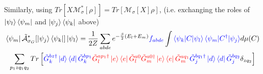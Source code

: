\documentclass[aps,floatfix,10pt,amssymb,amsfont,amsmath,superscriptaddress,float,nofootinbib,longbibliography,nobalancelastpage,twocolumn]{revtex4-2}
\begin{document}
Similarly, using $Tr[X\mathcal{M}^*_{\sigma}[\rho]] = Tr[\mathcal{M}_{\sigma}[X]\rho]$, (i.e. exchanging the roles of $\ket{\psi_l}\bra{\psi_m}$ and $\ket{\psi_j}\bra{\psi_k}$ above)
\begin{multline}
   \bra{\psi_m}\tilde{\mathcal{A}}^*_{\sigma_G}[\ket{\psi_j}\bra{\psi_k}]\ket{\psi_l} =\frac{1}{2Z} \sum_{abde} e^{-\frac{\beta}{2}(E_l+E_m)}\textcolor{blue}{f_{abde}} \int \textcolor{blue}{\braket{\psi_k|C|\psi_l}\braket{\psi_m|C^{\dagger}|\psi_j}} d\mu(C)\\\sum_{p_1z q_1 q_2} Tr\left[\textcolor{blue}{\tilde G^{bz\dagger}_k\ket{d}\bra{d}\tilde G^{bp_1}_k} \textcolor{red}{\tilde G_l^{ap_1\dagger}\ket{e}\bra{e}\tilde G_l^{a0}\tilde G_m^{a0\dagger}\ket{e}\bra{e}\tilde G_m^{aq_1}} \textcolor{blue}{\tilde G^{bq_1\dagger}_j\ket{d}\bra{d}\tilde G^{bq_2}_j } \delta_{zq_2}\right]
    \label{eq:A*rho}
\end{multline}
\end{document}
